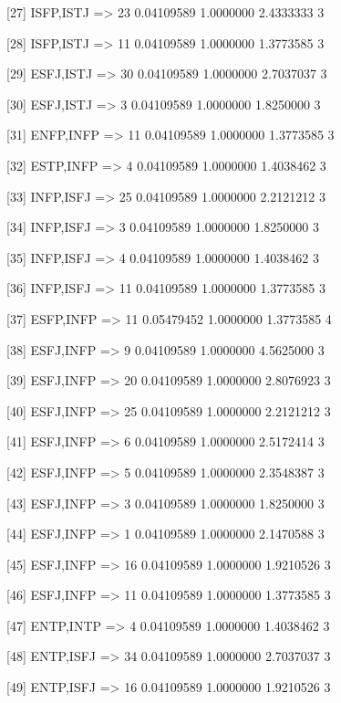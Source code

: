 [27]  {ISFP,ISTJ}           => {23} 0.04109589 1.0000000  2.4333333  3   

[28]  {ISFP,ISTJ}           => {11} 0.04109589 1.0000000  1.3773585  3   

[29]  {ESFJ,ISTJ}           => {30} 0.04109589 1.0000000  2.7037037  3   

[30]  {ESFJ,ISTJ}           => {3}  0.04109589 1.0000000  1.8250000  3   

[31]  {ENFP,INFP}           => {11} 0.04109589 1.0000000  1.3773585  3   

[32]  {ESTP,INFP}           => {4}  0.04109589 1.0000000  1.4038462  3   

[33]  {INFP,ISFJ}           => {25} 0.04109589 1.0000000  2.2121212  3   

[34]  {INFP,ISFJ}           => {3}  0.04109589 1.0000000  1.8250000  3   

[35]  {INFP,ISFJ}           => {4}  0.04109589 1.0000000  1.4038462  3   

[36]  {INFP,ISFJ}           => {11} 0.04109589 1.0000000  1.3773585  3   

[37]  {ESFP,INFP}           => {11} 0.05479452 1.0000000  1.3773585  4   

[38]  {ESFJ,INFP}           => {9}  0.04109589 1.0000000  4.5625000  3   

[39]  {ESFJ,INFP}           => {20} 0.04109589 1.0000000  2.8076923  3   

[40]  {ESFJ,INFP}           => {25} 0.04109589 1.0000000  2.2121212  3   

[41]  {ESFJ,INFP}           => {6}  0.04109589 1.0000000  2.5172414  3   

[42]  {ESFJ,INFP}           => {5}  0.04109589 1.0000000  2.3548387  3   

[43]  {ESFJ,INFP}           => {3}  0.04109589 1.0000000  1.8250000  3   

[44]  {ESFJ,INFP}           => {1}  0.04109589 1.0000000  2.1470588  3   

[45]  {ESFJ,INFP}           => {16} 0.04109589 1.0000000  1.9210526  3   

[46]  {ESFJ,INFP}           => {11} 0.04109589 1.0000000  1.3773585  3   

[47]  {ENTP,INTP}           => {4}  0.04109589 1.0000000  1.4038462  3   

[48]  {ENTP,ISFJ}           => {34} 0.04109589 1.0000000  2.7037037  3   

[49]  {ENTP,ISFJ}           => {16} 0.04109589 1.0000000  1.9210526  3   

